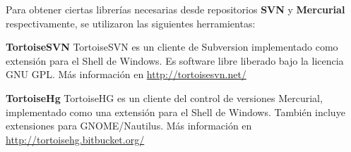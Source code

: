 \vspace{0.4cm}

Para obtener ciertas librerías necesarias desde repositorios \textbf{SVN} y \textbf{Mercurial} respectivamente, se utilizaron las siguientes herramientas:

\begin{description}
 \item \textbf{TortoiseSVN}
TortoiseSVN es un cliente de Subversion implementado como extensión para el Shell de Windows. Es software libre liberado bajo la licencia GNU GPL. Más información en \url{http://tortoisesvn.net/}

\item \textbf{TortoiseHg}
TortoiseHG es un cliente del control de versiones Mercurial, implementado como una extensión para el Shell de Windows. 
También incluye extensiones para GNOME/Nautilus. Más información en \url{http://tortoisehg.bitbucket.org/}

\end{description}
